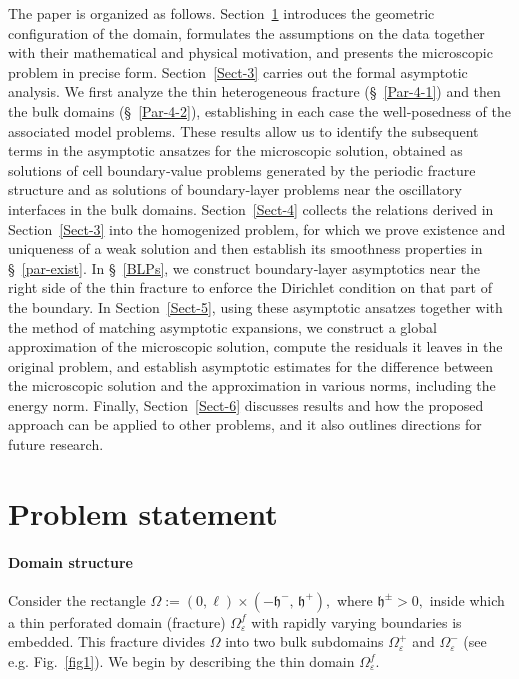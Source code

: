 \documentclass[reqno]{amsart}            %
\numberwithin{equation}{section}
\begin{document}
	\medskip 
	
	
	The paper is organized as follows. Section~\ref{Sec-2} introduces the geometric configuration of the domain, formulates the assumptions on the data together with their mathematical and physical motivation, and presents the microscopic problem in precise form.
	Section~\ref{Sect-3} carries out the formal asymptotic analysis. We first analyze the thin heterogeneous fracture (\S~\ref{Par-4-1}) and then the bulk domains (\S~\ref{Par-4-2}), establishing in each case the well‑posedness of the associated model problems. These results allow us to identify the subsequent terms in the asymptotic ansatzes for the microscopic solution, obtained as solutions of cell boundary‑value problems generated by the periodic fracture structure and as solutions of boundary‑layer problems near the oscillatory interfaces in the bulk domains.
	Section~\ref{Sect-4} collects the relations derived in Section~\ref{Sect-3} into the homogenized problem, for which we prove existence and uniqueness of a weak solution and then establish its  smoothness properties in \S~\ref{par-exist}.
	In \S~\ref{BLPs}, we construct boundary‑layer asymptotics near the right side of the thin fracture to enforce the Dirichlet condition on that part of the boundary. In Section~\ref{Sect-5}, using these asymptotic ansatzes together with the method of matching asymptotic expansions, we construct a global approximation of the microscopic solution, compute the residuals it leaves in the original problem, and establish asymptotic estimates for the difference between the microscopic solution and the approximation in various norms, including the energy norm. Finally, Section~\ref{Sect-6} discusses results and how the proposed approach can be applied to other problems, and it also outlines directions for future research.
	
	
	
	\section{Problem statement}\label{Sec-2}
	
	\paragraph*{{\bf Domain structure}}
	Consider the rectangle $\Omega := (0, \ell)\times(-\mathfrak{h}^-, \, \mathfrak{h}^+),$ where $\mathfrak{h}^\pm >0,$ inside which a thin perforated domain (fracture) $\Omega^f_\varepsilon$ with rapidly varying boundaries is embedded. This fracture divides $\Omega$ into two bulk subdomains $\Omega^+_\varepsilon$ and $\Omega^-_\varepsilon$ (see e.g. Fig.~\ref{fig1}).
	We begin by describing the thin domain $\Omega^f_\varepsilon.$  
	
\end{document}
